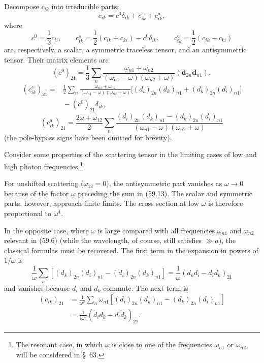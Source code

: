 Decompose $c_{ik}$ into irreducible parts:
\begin{equation}
c_{ik}=c^0\delta_{ik}+c_{ik}^s+c_{ik}^a,
\tag{59.9}
\end{equation}
where
\begin{equation}
c^0=\frac13c_{ii},\qquad c_{ik}^s=\frac12(c_{ik}+c_{ki})-c^0\delta_{ik},\qquad c_{ik}^a=\frac12(c_{ik}-c_{ki})
\tag{59.10}
\end{equation}
are, respectively, a scalar, a symmetric traceless tensor, and an antisymmetric tensor. Their matrix elements are
\begin{equation}
(c^0)_{21}=\frac13\sum_n\frac{\omega_{n1}+\omega_{n2}}{(\omega_{n1}-\omega)(\omega_{n2}+\omega)}(\mathbf d_{2n}\mathbf d_{n1}),
\tag{59.11}
\end{equation}
\begin{equation}
\begin{aligned}
(c_{ik}^s)_{21}={}&\frac12\sum_n\frac{\omega_{n1}+\omega_{n2}}{(\omega_{n1}-\omega)(\omega_{n2}+\omega)}
\bigl[(d_i)_{2n}(d_k)_{n1}+(d_k)_{2n}(d_i)_{n1}\bigr]\\
&{}-(c^0)_{21}\delta_{ik},
\end{aligned}
\tag{59.12}
\end{equation}
\begin{equation}
(c_{ik}^a)_{21}=\frac{2\omega+\omega_{12}}2\sum_n
\frac{(d_i)_{2n}(d_k)_{n1}-(d_k)_{2n}(d_i)_{n1}}{(\omega_{n1}-\omega)(\omega_{n2}+\omega)}
\tag{59.13}
\end{equation}
(the pole-bypass signs have been omitted for brevity).

Consider some properties of the scattering tensor in the limiting cases of low and high photon frequencies.\footnote{The resonant case, in which $\omega$ is close to one of the frequencies $\omega_{n1}$ or $\omega_{n2}$, will be considered in \S~63.}

For unshifted scattering ($\omega_{12}=0$), the antisymmetric part vanishes as $\omega\to0$ because of the factor $\omega$ preceding the sum in (59.13). The scalar and symmetric parts, however, approach finite limits. The cross section at low $\omega$ is therefore proportional to $\omega^4$.

In the opposite case, where $\omega$ is large compared with all frequencies $\omega_{n1}$ and $\omega_{n2}$ relevant in (59.6) (while the wavelength, of course, still satisfies $\gg a$), the classical formulas must be recovered. The first term in the expansion in powers of $1/\omega$ is
\[
\frac1\omega\sum_n[(d_k)_{2n}(d_i)_{n1}-(d_i)_{2n}(d_k)_{n1}]
=\frac1\omega(d_kd_i-d_id_k)_{21}
\]
and vanishes because $d_i$ and $d_k$ commute. The next term is
\[
\begin{aligned}
(c_{ik})_{21}&=\frac1{\omega^2}\sum_n\omega_{n1}[(d_i)_{2n}(d_k)_{n1}-(d_k)_{2n}(d_i)_{n1}]\\
&=\frac1{i\omega^2}(\dot d_i d_k-d_i\dot d_k)_{21}.
\end{aligned}
\]


